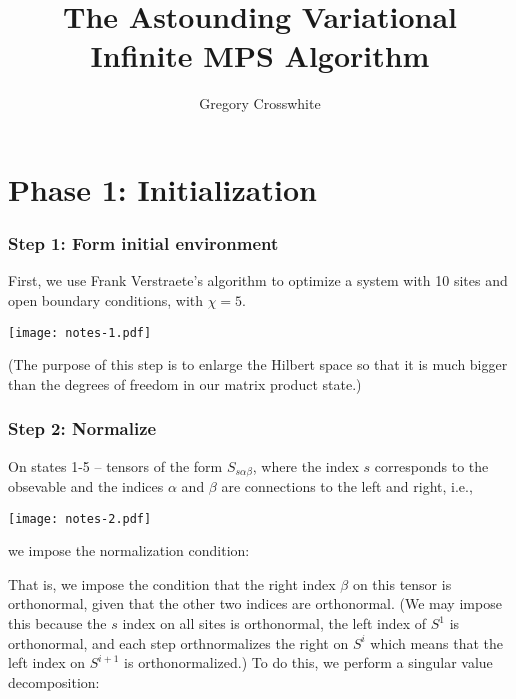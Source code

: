 \documentclass[12pt]{amsart}
\begin{document}


\author{Gregory Crosswhite}
\title{The Astounding Variational Infinite MPS Algorithm}

\maketitle

\tableofcontents

\part*{Phase 1:  Initialization}

\section*{Step 1: Form initial environment}

First, we use Frank Verstraete's algorithm to optimize a system with 10 sites and open boundary conditions, with $\chi=5$.

\begin{center}\texttt{[image: notes-1.pdf]}\end{center}

(The purpose of this step is to enlarge the Hilbert space so that it is much bigger than the degrees of freedom in our matrix product state.)

\section*{Step 2: Normalize}

\label{normalize-procedure}

On states 1-5 -- tensors of the form $S_{s\alpha\beta}$, where the index $s$ corresponds to the obsevable and the indices $\alpha$ and $\beta$ are connections to the left and right, i.e.,

\begin{center}\texttt{[image: notes-2.pdf]}\end{center}

\noindent we impose the normalization condition:


That is, we impose the condition that the right index $\beta$ on this tensor is orthonormal, given that the other two indices are orthonormal.  (We may impose this because the $s$ index on all sites is orthonormal, the left index of $S^1$ is orthonormal, and each step orthnormalizes the right on $S^i$ which means that the left index on $S^{i+1}$ is orthonormalized.)  To do this, we perform a singular value decomposition:
\end{document}
